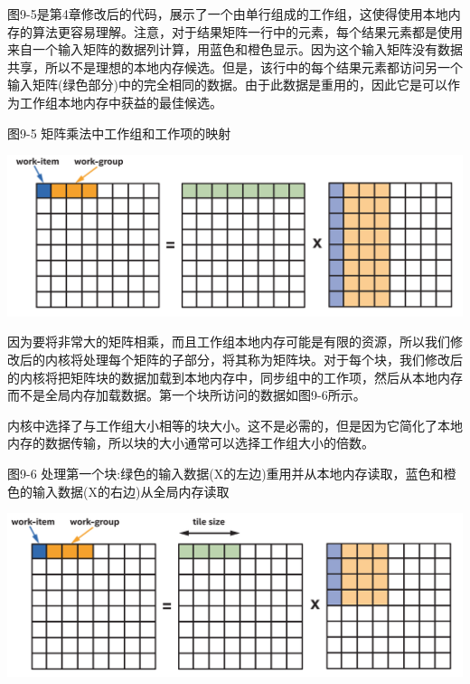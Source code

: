 图9-5是第4章修改后的代码，展示了一个由单行组成的工作组，这使得使用本地内存的算法更容易理解。注意，对于结果矩阵一行中的元素，每个结果元素都是使用来自一个输入矩阵的数据列计算，用蓝色和橙色显示。因为这个输入矩阵没有数据共享，所以不是理想的本地内存候选。但是，该行中的每个结果元素都访问另一个输入矩阵(绿色部分)中的完全相同的数据。由于此数据是重用的，因此它是可以作为工作组本地内存中获益的最佳候选。\par

\hspace*{\fill} \par %
图9-5 矩阵乘法中工作组和工作项的映射
\begin{center}
	\includegraphics[width=1.\textwidth]{content/chapter-9/images/5}
\end{center}

因为要将非常大的矩阵相乘，而且工作组本地内存可能是有限的资源，所以我们修改后的内核将处理每个矩阵的子部分，将其称为矩阵块。对于每个块，我们修改后的内核将把矩阵块的数据加载到本地内存中，同步组中的工作项，然后从本地内存而不是全局内存加载数据。第一个块所访问的数据如图9-6所示。\par

内核中选择了与工作组大小相等的块大小。这不是必需的，但是因为它简化了本地内存的数据传输，所以块的大小通常可以选择工作组大小的倍数。\par

\hspace*{\fill} \par %
图9-6 处理第一个块:绿色的输入数据(X的左边)重用并从本地内存读取，蓝色和橙色的输入数据(X的右边)从全局内存读取
\begin{center}
	\includegraphics[width=1.\textwidth]{content/chapter-9/images/6}
\end{center}

